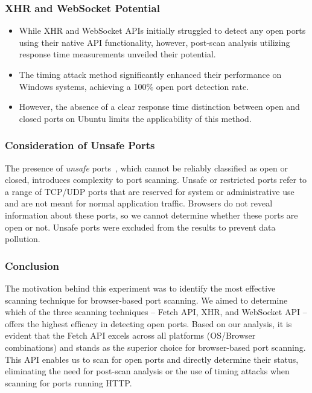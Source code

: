 \subsubsection{XHR and WebSocket Potential}

\begin{itemize}
    \item While XHR and WebSocket APIs initially struggled to detect any open ports using their native API functionality, however, post-scan analysis utilizing response time measurements unveiled their potential.
    \item The timing attack method significantly enhanced their performance on Windows systems, achieving a 100\% open port detection rate.
    \item However, the absence of a clear response time distinction between open and closed ports on Ubuntu limits the applicability of this method.
\end{itemize}

\subsubsection{Consideration of Unsafe Ports}

The presence of \emph{unsafe} ports~, which cannot be reliably classified as open or closed, introduces complexity to port scanning.
Unsafe or restricted ports refer to a range of TCP/UDP ports that are reserved for system or administrative use and are not meant for normal application traffic. Browsers do not reveal information about these ports, so we cannot determine whether these ports are open or not. Unsafe ports were excluded from the results to prevent data pollution.


\subsubsection{Conclusion}

The motivation behind this experiment was to identify the most effective scanning technique for browser-based port scanning. We aimed to determine which of the three scanning techniques -- Fetch API, XHR, and WebSocket API -- offers the highest efficacy in detecting open ports.
Based on our analysis, it is evident that the Fetch API excels across all platforms (OS/Browser combinations) and stands as the superior choice for browser-based port scanning. 
This API enables us to scan for open ports and directly determine their status, eliminating the need for post-scan analysis or the use of timing attacks when scanning for ports running HTTP.


